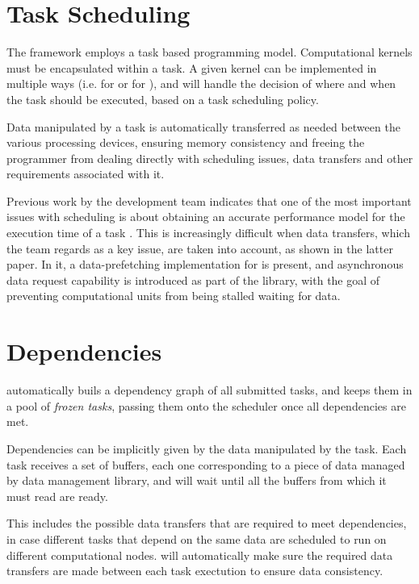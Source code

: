 \documentclass[main.tex]{subfiles}
\begin{document}
\section{Task Scheduling}

The framework employs a task based programming model. Computational kernels must be encapsulated within a task. A given kernel can be implemented in multiple ways (i.e. for \cpus or for \cuda), and \starpu will handle the decision of where and when the task should be executed, based on a task scheduling policy.

Data manipulated by a task is automatically transferred as needed between the various processing devices, ensuring memory consistency and freeing the programmer from dealing directly with scheduling issues, data transfers and other requirements associated with it.

Previous work by the \starpu development team indicates that one of the most important issues with scheduling is about obtaining an accurate performance model for the execution time of a task \cite{augonnet2010data,augonnet2010automatic}. This is increasingly difficult when data transfers, which the team regards as a key issue, are taken into account, as shown in the latter paper. In it, a data-prefetching implementation for \gpus is present, and asynchronous data request capability is introduced as part of the \starpu library, with the goal of preventing computational units from being stalled waiting for data.

\section{Dependencies}

\starpu automatically buils a dependency graph of all submitted tasks, and keeps them in a pool of \emph{frozen tasks}, passing them onto the scheduler once all dependencies are met.

Dependencies can be implicitly given by the data manipulated by the task. Each task receives a set of buffers, each one corresponding to a piece of data managed by \starpu data management library, and will wait until all the buffers from which it must read are ready.

This includes the possible data transfers that are required to meet dependencies, in case different tasks that depend on the same data are scheduled to run on different computational nodes. \starpu will automatically make sure the required data transfers are made between each task exectution to ensure data consistency.
\end{document}
